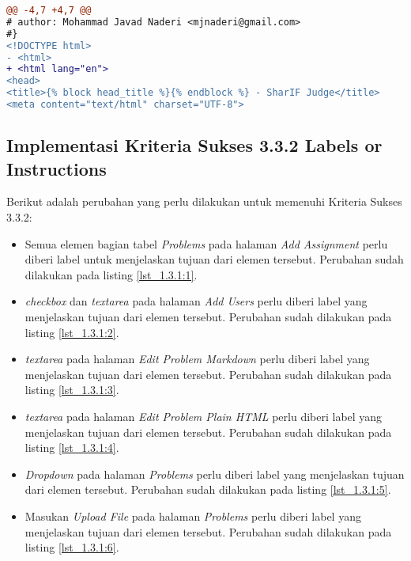 \begin{lstlisting}[language=diff, caption=Perubahan pada \textit{file} \textit{base.twig}, label=lst_3.1.1:1, basicstyle=\ttfamily, frame=single,
columns=fullflexible, keepspaces=true, breaklines=true]
@@ -4,7 +4,7 @@
# author: Mohammad Javad Naderi <mjnaderi@gmail.com>
#}
<!DOCTYPE html>
- <html>
+ <html lang="en">
<head>
<title>{% block head_title %}{% endblock %} - SharIF Judge</title>
<meta content="text/html" charset="UTF-8">
\end{lstlisting}

\subsection{Implementasi Kriteria Sukses 3.3.2 Labels or Instructions}
\label{subsec:implementasi_A_3.3.2}

Berikut adalah perubahan yang perlu dilakukan untuk memenuhi Kriteria Sukses 3.3.2:

\begin{itemize}
	\item Semua elemen bagian tabel \textit{Problems} pada halaman \textit{Add Assignment} perlu diberi label untuk menjelaskan tujuan dari elemen tersebut. Perubahan sudah dilakukan pada listing \ref{lst_1.3.1:1}.
	
	\item \textit{checkbox} dan \textit{textarea} pada halaman \textit{Add Users} perlu diberi label yang menjelaskan tujuan dari elemen tersebut. Perubahan sudah dilakukan pada listing \ref{lst_1.3.1:2}.
	
	\item \textit{textarea} pada halaman \textit{Edit Problem Markdown} perlu diberi label yang menjelaskan tujuan dari elemen tersebut. Perubahan sudah dilakukan pada listing \ref{lst_1.3.1:3}.
	
	\item \textit{textarea} pada halaman \textit{Edit Problem Plain HTML} perlu diberi label yang menjelaskan tujuan dari elemen tersebut. Perubahan sudah dilakukan pada listing \ref{lst_1.3.1:4}.
	
	\item \textit{Dropdown} pada halaman \textit{Problems} perlu diberi label yang menjelaskan tujuan dari elemen tersebut. Perubahan sudah dilakukan pada listing \ref{lst_1.3.1:5}.
	
	\item Masukan \textit{Upload File} pada halaman \textit{Problems} perlu diberi label yang menjelaskan tujuan dari elemen tersebut. Perubahan sudah dilakukan pada listing \ref{lst_1.3.1:6}.
\end{itemize}

